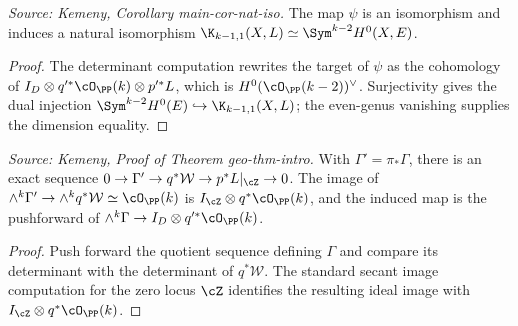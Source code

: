 \begin{corollary}
  \label{cor:kemeny_extremal_syzygy_iso}
  \textit{Source: Kemeny, Corollary main-cor-nat-iso.}
  The map \(\psi\) is an isomorphism and induces a natural isomorphism
  \(\K_{k-1,1}(X,L)\simeq \Sym^{k-2}H^0(X,E)\).
\end{corollary}
\begin{proof}
  The determinant computation rewrites the target of \(\psi\) as the cohomology
  of \(I_D\otimes q'^*\cO_{\PP}(k)\otimes p'^*L\), which is
  \(H^0(\cO_{\PP}(k-2))^\vee\).  Surjectivity gives the dual injection
  \(\Sym^{k-2}H^0(E)\hookrightarrow \K_{k-1,1}(X,L)\); the even-genus vanishing
  supplies the dimension equality.
\end{proof}

\begin{lemma}
  \label{lem:kemeny_gamma_prime_image}
  \textit{Source: Kemeny, Proof of Theorem geo-thm-intro.}
  With \(\Gamma'=\pi_*\Gamma\), there is an exact sequence
  \(0\to\Gamma'\to q^*\mathcal W\to p^*L|_{\cZ}\to0\).  The image of
  \(\wedge^k\Gamma'\to\wedge^kq^*\mathcal W\simeq\cO_{\PP}(k)\) is
  \(I_{\cZ}\otimes q^*\cO_{\PP}(k)\), and the induced map is the pushforward of
  \(\wedge^k\Gamma\to I_D\otimes q'^*\cO_{\PP}(k)\).
\end{lemma}
\begin{proof}
  Push forward the quotient sequence defining \(\Gamma\) and compare its
  determinant with the determinant of \(q^*\mathcal W\).  The standard secant
  image computation for the zero locus \(\cZ\) identifies the resulting ideal
  image with \(I_{\cZ}\otimes q^*\cO_{\PP}(k)\).
\end{proof}

